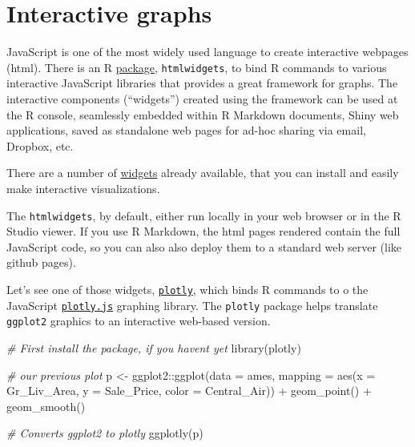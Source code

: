\documentclass[
]{book}
\newenvironment{Shaded}{\begin{snugshade}}{\end{snugshade}}
\newcommand{\AttributeTok}[1]{\textcolor[rgb]{0.77,0.63,0.00}{#1}}
\newcommand{\CommentTok}[1]{\textcolor[rgb]{0.56,0.35,0.01}{\textit{#1}}}
\newcommand{\FunctionTok}[1]{\textcolor[rgb]{0.00,0.00,0.00}{#1}}
\newcommand{\NormalTok}[1]{#1}
\newcommand{\OtherTok}[1]{\textcolor[rgb]{0.56,0.35,0.01}{#1}}
\newcommand{\SpecialCharTok}[1]{\textcolor[rgb]{0.00,0.00,0.00}{#1}}
\begin{document}
\hypertarget{interactive-graphs}{%
\section{Interactive graphs}\label{interactive-graphs}}

JavaScript is one of the most widely used language to create interactive webpages (html). There is an R \href{https://www.htmlwidgets.org}{package}, \texttt{htmlwidgets}, to bind R commands to various interactive JavaScript libraries that provides a great framework for graphs. The interactive components (``widgets'') created using the framework can be used at the R console, seamlessly embedded within R Markdown documents, Shiny web applications, saved as standalone web pages for ad-hoc sharing via email, Dropbox, etc.

There are a number of \href{http://gallery.htmlwidgets.org}{widgets} already available, that you can install and easily make interactive visualizations.

The \texttt{htmlwidgets}, by default, either run locally in your web browser or in the R Studio viewer. If you use R Markdown, the html pages rendered contain the full JavaScript code, so you can also also deploy them to a standard web server (like github pages).

Let's see one of those widgets, \href{https://plotly.com/r/}{\texttt{plotly}}, which binds R commands to o the JavaScript \href{https://plotly.com/javascript/}{\texttt{plotly.js}} graphing library. The \texttt{plotly} package helps translate \texttt{ggplot2} graphics to an interactive web-based version.

\begin{Shaded}
\begin{Highlighting}[]
\CommentTok{\# First install the package, if you haven\textquotesingle{}t yet}
\FunctionTok{library}\NormalTok{(plotly)}

\CommentTok{\# our previous plot}
\NormalTok{p }\OtherTok{\textless{}{-}}\NormalTok{ ggplot2}\SpecialCharTok{::}\FunctionTok{ggplot}\NormalTok{(}\AttributeTok{data =}\NormalTok{ ames, }
       \AttributeTok{mapping =} \FunctionTok{aes}\NormalTok{(}\AttributeTok{x =}\NormalTok{ Gr\_Liv\_Area, }
                     \AttributeTok{y =}\NormalTok{ Sale\_Price,}
                     \AttributeTok{color =}\NormalTok{ Central\_Air)) }\SpecialCharTok{+}
  \FunctionTok{geom\_point}\NormalTok{() }\SpecialCharTok{+}
  \FunctionTok{geom\_smooth}\NormalTok{()}

\CommentTok{\# Converts ggplot2 to plotly}
\FunctionTok{ggplotly}\NormalTok{(p)}
\end{Highlighting}
\end{Shaded}
\end{document}
